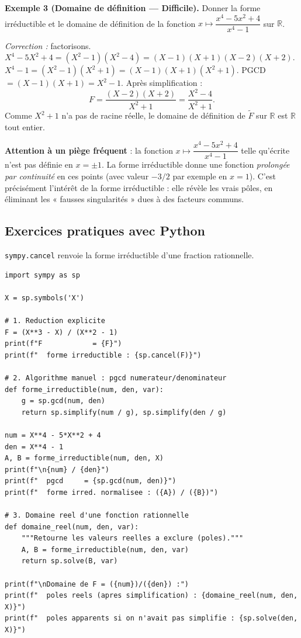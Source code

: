 \textbf{Exemple 3 (Domaine de définition --- Difficile).}
Donner la forme irréductible et le domaine de définition de la fonction $x \mapsto \dfrac{x^4 - 5x^2 + 4}{x^4 - 1}$ sur $\mathbb{R}$.

\textit{Correction :} factorisons.
$X^4 - 5X^2 + 4 = (X^2 - 1)(X^2 - 4) = (X - 1)(X + 1)(X - 2)(X + 2)$.
$X^4 - 1 = (X^2 - 1)(X^2 + 1) = (X - 1)(X + 1)(X^2 + 1)$.
PGCD $= (X - 1)(X + 1) = X^2 - 1$.
Après simplification :
\[ F = \frac{(X - 2)(X + 2)}{X^2 + 1} = \frac{X^2 - 4}{X^2 + 1}. \]
Comme $X^2 + 1$ n'a pas de racine réelle, le domaine de définition de $\widetilde{F}$ sur $\mathbb{R}$ est $\mathbb{R}$ tout entier.

\smallskip

\textbf{Attention à un piège fréquent} : la fonction $x \mapsto \dfrac{x^4 - 5x^2 + 4}{x^4 - 1}$ telle qu'écrite n'est pas définie en $x = \pm 1$. La forme irréductible donne une fonction \emph{prolongée par continuité} en ces points (avec valeur $-3/2$ par exemple en $x = 1$). C'est précisément l'intérêt de la forme irréductible : elle révèle les vrais pôles, en éliminant les « fausses singularités » dues à des facteurs communs.

\subsection{Exercices pratiques avec Python}
\texttt{sympy.cancel} renvoie la forme irréductible d'une fraction rationnelle.

\begin{lstlisting}
import sympy as sp

X = sp.symbols('X')

# 1. Reduction explicite
F = (X**3 - X) / (X**2 - 1)
print(f"F            = {F}")
print(f"  forme irreductible : {sp.cancel(F)}")

# 2. Algorithme manuel : pgcd numerateur/denominateur
def forme_irreductible(num, den, var):
    g = sp.gcd(num, den)
    return sp.simplify(num / g), sp.simplify(den / g)

num = X**4 - 5*X**2 + 4
den = X**4 - 1
A, B = forme_irreductible(num, den, X)
print(f"\n{num} / {den}")
print(f"  pgcd     = {sp.gcd(num, den)}")
print(f"  forme irred. normalisee : ({A}) / ({B})")

# 3. Domaine reel d'une fonction rationnelle
def domaine_reel(num, den, var):
    """Retourne les valeurs reelles a exclure (poles)."""
    A, B = forme_irreductible(num, den, var)
    return sp.solve(B, var)

print(f"\nDomaine de F = ({num})/({den}) :")
print(f"  poles reels (apres simplification) : {domaine_reel(num, den, X)}")
print(f"  poles apparents si on n'avait pas simplifie : {sp.solve(den, X)}")
\end{lstlisting}

